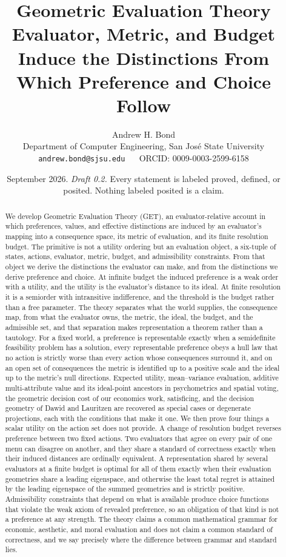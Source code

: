 \documentclass[11pt]{article}
\title{\textbf{Geometric Evaluation Theory}\\[4pt]
\large Evaluator, Metric, and Budget Induce the Distinctions From Which Preference and Choice Follow}
\author{Andrew H. Bond\\
\small Department of Computer Engineering, San Jos\'e State University\\
\small \texttt{andrew.bond@sjsu.edu} ~\textbar~ ORCID: 0009-0003-2599-6158}
\date{September 2026. \emph{Draft 0.2.} Every statement is labeled proved, defined, or posited. Nothing labeled posited is a claim.}
\theoremstyle{definition}
\theoremstyle{remark}
\begin{document}
\maketitle

\begin{abstract}
We develop Geometric Evaluation Theory (GET), an evaluator-relative account in which preferences, values, and effective distinctions are induced by an evaluator's mapping into a consequence space, its metric of evaluation, and its finite resolution budget.
The primitive is not a utility ordering but an evaluation object, a six-tuple of states, actions, evaluator, metric, budget, and admissibility constraints.
From that object we derive the distinctions the evaluator can make, and from the distinctions we derive preference and choice.
At infinite budget the induced preference is a weak order with a utility, and the utility is the evaluator's distance to its ideal.
At finite resolution it is a semiorder with intransitive indifference, and the threshold is the budget rather than a free parameter.
The theory separates what the world supplies, the consequence map, from what the evaluator owns, the metric, the ideal, the budget, and the admissible set, and that separation makes representation a theorem rather than a tautology.
For a fixed world, a preference is representable exactly when a semidefinite feasibility problem has a solution, every representable preference obeys a hull law that no action is strictly worse than every action whose consequences surround it, and on an open set of consequences the metric is identified up to a positive scale and the ideal up to the metric's null directions.
Expected utility, mean--variance evaluation, additive multi-attribute value and its ideal-point ancestors in psychometrics and spatial voting, the geometric decision cost of our economics work, satisficing, and the decision geometry of Dawid and Lauritzen are recovered as special cases or degenerate projections, each with the conditions that make it one.
We then prove four things a scalar utility on the action set does not provide.
A change of resolution budget reverses preference between two fixed actions.
Two evaluators that agree on every pair of one menu can disagree on another, and they share a standard of correctness exactly when their induced distances are ordinally equivalent.
A representation shared by several evaluators at a finite budget is optimal for all of them exactly when their evaluation geometries share a leading eigenspace, and otherwise the least total regret is attained by the leading eigenspace of the summed geometries and is strictly positive.
Admissibility constraints that depend on what is available produce choice functions that violate the weak axiom of revealed preference, so an obligation of that kind is not a preference at any strength.
The theory claims a common mathematical grammar for economic, aesthetic, and moral evaluation and does not claim a common standard of correctness, and we say precisely where the difference between grammar and standard lies.
\end{abstract}
\end{document}
